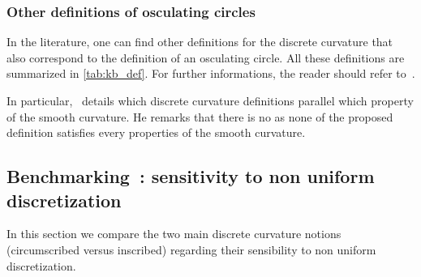 \subsubsection{Other definitions of osculating circles}
In the literature, one can find other definitions for the discrete curvature that also correspond to the definition of an osculating circle. All these definitions are summarized in \cref{tab:kb_def}. For further informations, the reader should refer to~\cite{Carroll2014, Vouga2014, Bobenko2015, Romon2013}.

In particular,~\citet{Vouga2014} details which discrete curvature definitions parallel which property of the smooth curvature. He remarks that there is no  as none of the proposed definition satisfies every properties of the smooth curvature.

%







\subsection{Benchmarking~: sensitivity to non uniform discretization}\label{sec:bench_disc}
In this section we compare the two main discrete curvature notions (circumscribed versus inscribed) regarding their sensibility to non uniform discretization.

